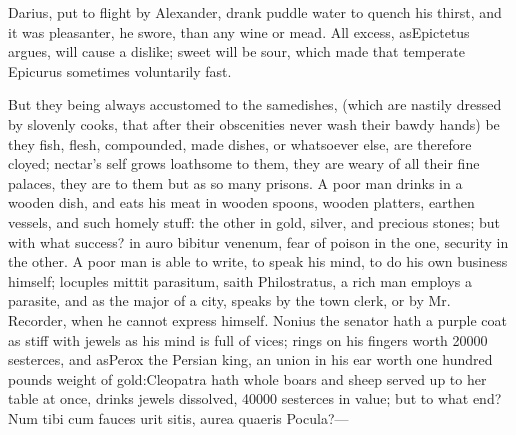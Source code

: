 {Darius, put to flight by Alexander, drank puddle water to quench his
thirst, and it was pleasanter, he swore, than any wine or mead. All
excess, asEpictetus argues, will cause a dislike; sweet will be
sour, which made that temperate Epicurus sometimes voluntarily fast.

But they being always accustomed to the samedishes, (which are
nastily dressed by slovenly cooks, that after their obscenities never
wash their bawdy hands) be they fish, flesh, compounded, made dishes,
or whatsoever else, are therefore cloyed; nectar's self grows loathsome
to them, they are weary of all their fine palaces, they are to them but
as so many prisons. A poor man drinks in a wooden dish, and eats his
meat in wooden spoons, wooden platters, earthen vessels, and such
homely stuff: the other in gold, silver, and precious stones; but with
what success? in auro bibitur venenum, fear of poison in the one,
security in the other. A poor man is able to write, to speak his mind,
to do his own business himself; locuples mittit parasitum, saith
Philostratus, a rich man employs a parasite, and as the major of
a city, speaks by the town clerk, or by Mr. Recorder, when he cannot
express himself. Nonius the senator hath a purple coat as stiff
with jewels as his mind is full of vices; rings on his fingers worth
20\thinspace{}000 sesterces, and asPerox the Persian king, an union in his
ear worth one hundred pounds weight of gold:Cleopatra hath whole
boars and sheep served up to her table at once, drinks jewels
dissolved, 40\thinspace{}000 sesterces in value; but to what end?
Num tibi cum fauces urit sitis, aurea quaeris
Pocula?---

}
